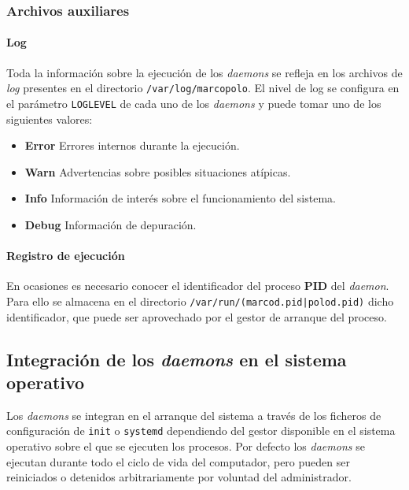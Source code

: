 
\subsubsection{Archivos auxiliares}

\paragraph{Log}
Toda la información sobre la ejecución de los \textit{daemons} se refleja en los archivos de \textit{log} presentes en el directorio \texttt{/var/log/marcopolo}. El nivel de log se configura en el parámetro \texttt{LOGLEVEL} de cada uno de los \textit{daemons} y puede tomar uno de los siguientes valores:

\begin{itemize}
\item \textbf{Error} Errores internos durante la ejecución.
\item \textbf{Warn} Advertencias sobre posibles situaciones atípicas.
\item \textbf{Info} Información de interés sobre el funcionamiento del sistema.
\item \textbf{Debug} Información de depuración.
\end{itemize}


\paragraph{Registro de ejecución}

En ocasiones es necesario conocer el identificador del proceso \textbf{PID} del \textit{daemon}. Para ello se almacena en el directorio \texttt{/var/run/(marcod.pid|polod.pid)} dicho identificador, que puede ser aprovechado por el gestor de arranque del proceso.

\subsection{Integración de los \textit{daemons} en el sistema operativo}

Los \textit{daemons} se integran en el arranque del sistema a través de los ficheros de configuración de \texttt{init}\citationneeded{} o \texttt{systemd} dependiendo del gestor disponible en el sistema operativo sobre el que se ejecuten los procesos. Por defecto los \textit{daemons} se ejecutan durante todo el ciclo de vida del computador, pero pueden ser reiniciados o detenidos arbitrariamente por voluntad del administrador.

